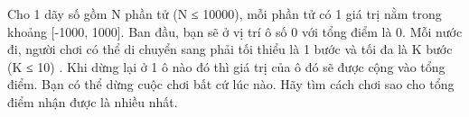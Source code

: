 Cho 1 dãy số gồm N phần tử (N ≤ 10000), mỗi phần tử có 1 giá trị nằm trong khoảng [-1000, 1000]. Ban đầu, bạn sẽ ở vị trí ô số 0 với tổng điểm là 0. Mỗi nước đi, người chơi có thể di chuyển sang phải tối thiểu là 1 bước và tối đa là K bước (K ≤ 10) . Khi dừng lại ở 1 ô nào đó thì giá trị của ô đó sẽ được cộng vào tổng điểm. Bạn có thể dừng cuộc chơi bất cứ lúc nào. Hãy tìm cách chơi sao cho tổng điểm nhận được là nhiều nhất.